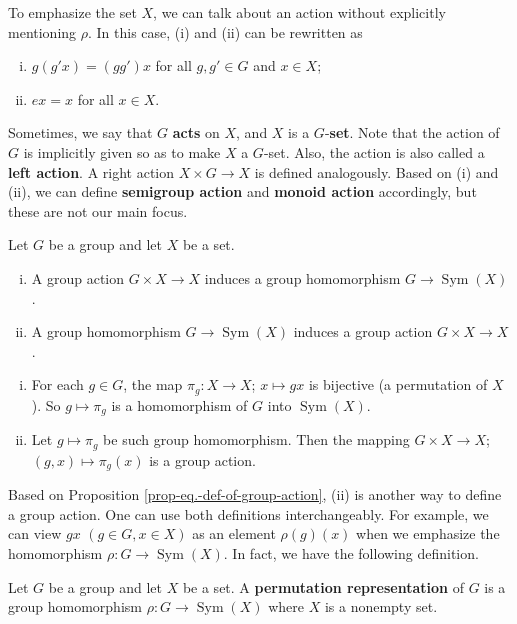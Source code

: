 \begin{remark}
	To emphasize the set $X$, we can talk about an action without explicitly mentioning $\rho$. In this case, (i) and (ii) can be rewritten as 
\begin{enumerate}[(i)]
	\item $g(g'x) = (gg')x$ for all $g,g'\in G$ and $x\in X$;
	\item $ex =x$ for all $x\in X$.
\end{enumerate}
Sometimes, we say that $G$ \textbf{acts} on $X$, and $X$ is a $G$-\textbf{set}. Note that the action of $G$ is implicitly given so as to make $X$ a $G$-set. Also, the action is also called a \textbf{left action}. A right action $X\times G\rightarrow X$ is defined analogously. Based on (i) and (ii), we can define \textbf{semigroup action} and \textbf{monoid action} accordingly, but these are not our main focus.


\begin{proposition} \label{prop-eq.-def-of-group-action} Let $G$ be a group and let $X$ be a set.
	\begin{enumerate}[(i)]
		\item A group action $G\times X\rightarrow X$ induces a group homomorphism $G\rightarrow \operatorname{Sym}(X)$.
		\item A group homomorphism $G\rightarrow \operatorname{Sym}(X)$ induces a group action $G\times X\rightarrow X$.
	\end{enumerate}
\end{proposition}
\begin{sketch}
	\begin{enumerate}[(i)]
		\item For each $g\in G$, the map $\pi_g:X\rightarrow X$; $x\mapsto gx$ is bijective (a permutation of $X$). So $g\mapsto \pi_g$ is a homomorphism of $G$ into $\operatorname{Sym}(X)$.
		\item Let $g\mapsto \pi_g$ be such group homomorphism. Then the mapping $G\times X\rightarrow X$; $(g,x) \mapsto \pi_g(x)$ is a group action. \qedhere
	\end{enumerate}
\end{sketch}
Based on Proposition \ref{prop-eq.-def-of-group-action}, (ii) is another way to define a group action. One can use both definitions interchangeably. For example, we can view $gx$ $(g\in G,x\in X)$ as an element $\rho(g)(x)$ when we emphasize the homomorphism $\rho:G\rightarrow \operatorname{Sym}(X)$. In fact, we have the following definition.
\begin{definition}
	Let $G$ be a group and let $X$ be a set.  A \textbf{permutation representation} of $G$ is a group homomorphism  $\rho:G\rightarrow \operatorname{Sym}(X)$ where $X$ is a nonempty set.
\end{definition}


\end{remark}

